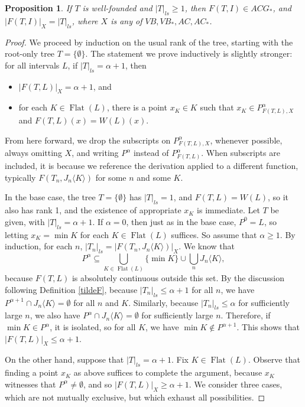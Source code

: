 \documentclass[12pt]{amsart}
\newtheorem{prop}[theorem]{Proposition}
\renewcommand{\flat}{\operatorname{Flat}}
\newcommand{\august}[1]{#1}%
\begin{document}
\begin{prop} If $T$ is well-founded and 
$|T|_{ls}\geq 1$, then $F(T,I) \in ACG_\ast$, and 
$|F(T,I)|_X = |T|_{ls}$, where $X$ is any of $VB, VB_\ast, AC, AC_\ast$.
\end{prop}
\begin{proof}
We proceed by induction on the usual rank of the tree, starting with the 
root-only tree 
$T=\{\emptyset\}$.  The statement we prove inductively is slightly stronger: 
for all intervals $L$, 
if $|T|_{ls} = \alpha+1$, then 

\begin{itemize}
\item $|F(T,L)|_X = \alpha+1$, and 
\item \august{for each $K \in \flat(L)$, there is a point $x_K \in K$ such 
that
$x_K \in P^\alpha_{F(T,L), X}$ and $F(T,L)(x) = W(L)(x)$.}
\end{itemize}
  From here forward, we 
drop the subscripts on $P^\alpha_{F(T,L), X}$, whenever 
possible, \august{always omitting $X$, and} writing $P^\alpha$ 
\august{instead of $P^\alpha_{F(T,L)}$}.  When subscripts are included, it is 
because we reference the derivation applied to a different function,
typically $F(T_n, J_n\langle K\rangle)$ for some $n$ and some $K$.

In the base case, the tree $T = \{\emptyset\}$ has $|T|_{ls} = 1$, and 
$F(T,L) = W(L)$, 
so it also has rank 1, \august{and the existence of appropriate $x_K$ 
is immediate}.  Let $T$ be given, with $|T|_{ls} = \alpha + 1$. 
\august{If $\alpha = 0$, then just as in the base case, $P^0 = L$, 
so letting $x_K = \min K$ for each $K \in \flat(L)$ suffices.  So 
assume that $\alpha \geq 1$.}
By induction, for each $n$, $|T_n|_{ls} = |F(T_n,J_n\langle K \rangle)|_X$.  
We know that
$$P^\alpha \subseteq \bigcup_{K \in \flat(L)} \{\min K\} \cup \bigcup_n J_n\langle K \rangle,$$ 
because $F(T,L)$ \august{is absolutely continuous} outside this set. 
\august{By the discussion following Definition \mbox{\ref{tildeF}}},
because $|T_n|_{ls} \leq \alpha+1$ 
for all $n$, we have $P^{\alpha+1} \cap J_n\langle K \rangle = \emptyset$ for 
all $n$ \august{and $K$}. 
Similarly, because $|T_n|_{ls} \leq \alpha$ for sufficiently large $n$,
we also have $P^\alpha \cap J_n\langle K \rangle = \emptyset$ for sufficiently 
large $n$.  Therefore, if $\min K \in P^\alpha$, it is isolated, so 
\august{for all $K$}, we have $\min K \not \in P^{\alpha+1}$. 
This shows that $|F(T,L)|_X \leq \alpha +1$.

On the other hand, suppose that $|T|_{ls} = \alpha+1$.  
\august{Fix $K \in \flat(L)$.  Observe 
that finding a point $x_K$ as above suffices to complete the argument, 
because $x_K$ witnesses that $P^\alpha \neq \emptyset$, and so 
$|F(T,L)|_X \geq \alpha+1$.  We consider three 
cases, which are not mutually exclusive, but which exhaust all possibilities.} 


\end{proof}
\end{document}
